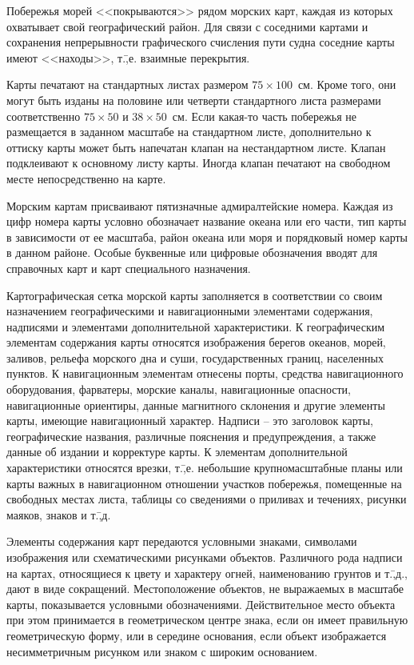 \documentclass[a4paper, 12pt, twoside, final, book, russian, fittopage, cyremdash]{ncc}
\begin{document}
Побережья морей <<покрываются>> рядом морских карт, каждая из которых охватывает свой географический район. Для связи с соседними картами и сохранения непрерывности графического счисления пути судна соседние карты имеют <<находы>>, т.\=,е. взаимные перекрытия. 

Карты печатают на стандартных листах размером $75 \times 100$~см. Кроме того, они могут быть изданы на половине или четверти стандартного листа размерами соответственно $75 \times 50$ и $38 \times 50$~см. Если какая-то часть побережья не размещается в заданном масштабе на стандартном листе, дополнительно к оттиску карты может быть напечатан клапан на нестандартном листе. Клапан подклеивают к основному листу карты. Иногда клапан печатают на свободном месте непосредственно на карте. 

Морским картам присваивают пятизначные адмиралтейские номера. Каждая из цифр номера карты условно обозначает название океана или его части, тип карты в зависимости от ее масштаба, район океана или моря и порядковый номер карты в данном районе. Особые буквенные или цифровые обозначения вводят для справочных карт и карт специального назначения. 

Картографическая сетка морской карты заполняется в соответствии со своим назначением географическими и навигационными элементами содержания, надписями и элементами дополнительной характеристики. К географическим элементам содержания карты относятся изображения берегов океанов, морей, заливов, рельефа морского дна и суши, государственных границ, населенных пунктов. К навигационным элементам отнесены порты, средства навигационного оборудования, фарватеры, морские каналы, навигационные опасности, навигационные ориентиры, данные магнитного склонения и другие элементы карты, имеющие навигационный характер. Надписи \--- это заголовок карты, географические названия, различные пояснения и предупреждения, а также данные об издании и корректуре карты. К элементам дополнительной характеристики относятся врезки, т.\=,е. небольшие крупномасштабные планы или карты важных в навигационном отношении участков побережья, помещенные на свободных местах листа, таблицы со сведениями о приливах и течениях, рисунки маяков, знаков и т.\=,д.
 
Элементы содержания карт передаются условными знаками, символами изображения или схематическими рисунками объектов. Различного рода надписи на картах, относящиеся к цвету и характеру огней, наименованию грунтов и т.\=,д., дают в виде сокращений. Местоположение объектов, не выражаемых в масштабе карты, показывается условными обозначениями. Действительное место объекта при этом принимается в геометрическом центре знака, если он имеет правильную геометрическую форму, или в середине основания, если объект изображается несимметричным рисунком или знаком с широким основанием. 
\end{document}
